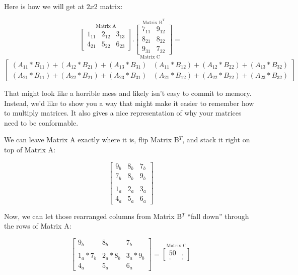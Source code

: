 \documentclass[
  letterpaper,
]{krantz}
\begin{document}
Here is how we will get at \(2x2\) matrix:

\[
\stackrel{\mbox{Matrix A}}{
\begin{bmatrix}
1_{11} & 2_{12} & 3_{13}\\
4_{21} & 5_{22} & 6_{23}
\end{bmatrix}
}
.
\stackrel{\mbox{Matrix B}^T}{
\begin{bmatrix}
7_{11} & 9_{12} \\ 
8_{21}& 8_{22}\\
9_{31} & 7_{32}
\end{bmatrix} 
}
=
\] \[
\stackrel{\mbox{Matrix C}}{
\begin{bmatrix}
(A_{11}*B_{11})+(A_{12}*B_{21})+(A_{13}*B_{31}) & (A_{11}*B_{12})+(A_{12}*B_{22})+(A_{13}*B_{32}) \\
(A_{21}*B_{11})+(A_{22}*B_{21})+(A_{23}*B_{31}) & (A_{21}*B_{12})+(A_{22}*B_{22})+(A_{23}*B_{32})
\end{bmatrix} 
}
\]

That might look like a horrible mess and likely isn't easy to commit to
memory. Instead, we'd like to show you a way that might make it easier
to remember how to multiply matrices. It also gives a nice
representation of why your matrices need to be conformable.

We can leave Matrix A exactly where it is, flip Matrix B\(^T\), and
stack it right on top of Matrix A:

\[
\begin{bmatrix}
9_{b} & 8_{b} & 7_{b} \\
7_{b} & 8_{b} & 9_{b} \\
\\
1_{a} & 2_{a} & 3_{a} \\
4_{a} & 5_{a} & 6_{a}
\end{bmatrix}
\]

Now, we can let those rearranged columns from Matrix B\(^T\) ``fall
down'' through the rows of Matrix A:

\[
\begin{bmatrix}
9_{b} & 8_{b} & 7_{b} \\
\\
1_{a}*7_{b} & 2_{a}*8_{b} & 3_{a}*9_{b}\\
4_{a} & 5_{a} & 6_{a}
\end{bmatrix}
= 
\stackrel{\mbox{Matrix C}}{
\begin{bmatrix}
50 & .\\
. & .
\end{bmatrix}
}
\]
\end{document}
